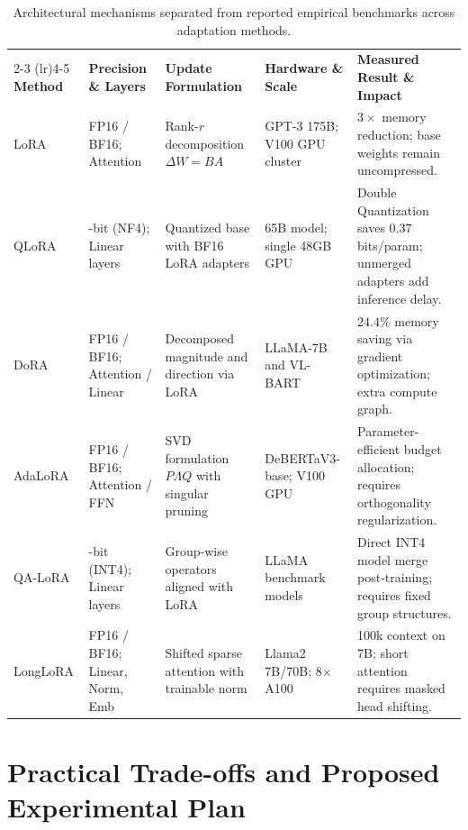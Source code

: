 \documentclass[11pt,a4paper]{article}
\begin{document}
\begin{table}[t]
\centering
\small
\caption{Architectural mechanisms separated from reported empirical benchmarks across adaptation methods.}
\label{tab:comparison}
\begin{tabularx}{\textwidth}{l >{\raggedright\arraybackslash}p{2.1cm} >{\raggedright\arraybackslash}p{2.6cm} >{\raggedright\arraybackslash}p{2.3cm} >{\raggedright\arraybackslash}X}
\toprule
 & \multicolumn{2}{c}{\textbf{Architectural Design Choices}} & \multicolumn{2}{c}{\textbf{Reported Empirical Benchmarks}} \\
\cmidrule(lr){2-3} \cmidrule(lr){4-5}
\textbf{Method} & \textbf{Precision \& Layers} & \textbf{Update Formulation} & \textbf{Hardware \& Scale} & \textbf{Measured Result \& Impact} \\
\midrule
LoRA \cite{hu2021lora} & FP16 / BF16; Attention & Rank-$r$ decomposition $\Delta W = BA$ & GPT-3 175B; V100 GPU cluster & $3\times$ memory reduction; base weights remain uncompressed. \\
\addlinespace
QLoRA \cite{dettmers2023qlora} & 4-bit (NF4); Linear layers & Quantized base with BF16 LoRA adapters & 65B model; single 48GB GPU & Double Quantization saves $0.37$ bits/param; unmerged adapters add inference delay. \\
\addlinespace
DoRA \cite{liu2024dora} & FP16 / BF16; Attention / Linear & Decomposed magnitude and direction via LoRA & LLaMA-7B and VL-BART & $24.4\%$ memory saving via gradient optimization; extra compute graph. \\
\addlinespace
AdaLoRA \cite{zhang2023adalora} & FP16 / BF16; Attention / FFN & SVD formulation $P \Lambda Q$ with singular pruning & DeBERTaV3-base; V100 GPU & Parameter-efficient budget allocation; requires orthogonality regularization. \\
\addlinespace
QA-LoRA \cite{xu2023qa} & 4-bit (INT4); Linear layers & Group-wise operators aligned with LoRA & LLaMA benchmark models & Direct INT4 model merge post-training; requires fixed group structures. \\
\addlinespace
LongLoRA \cite{chen2023longlora} & FP16 / BF16; Linear, Norm, Emb & Shifted sparse attention with trainable norm & Llama2 7B/70B; 8$\times$ A100 & 100k context on 7B; short attention requires masked head shifting. \\
\bottomrule
\end{tabularx}
\end{table}

\section{Practical Trade-offs and Proposed Experimental Plan}
\end{document}
